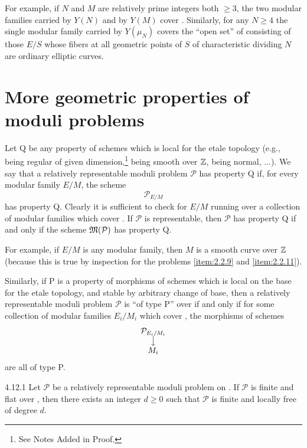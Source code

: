 For example, if $N$ and $M$ are relatively prime integers both $\ge 3$, the two modular families carried by $Y(N)$ and by $Y(M)$ cover \Ell. Similarly, for any $N \ge 4$ the single modular family carried by $Y(\mu_N)$ covers the ``open set'' of \Ell consisting of those $E/S$ whose fibers at all geometric points of $S$ of characteristic dividing $N$ are ordinary elliptic curves.

\section{More geometric properties of moduli problems}
\label{sec:4.12}

Let Q be any property of schemes which is local for the etale topology (e.g., being regular of given dimension,\footnote{See Notes Added in Proof.} being smooth over $\mathbb{Z}$, being normal, ...). We say that a relatively representable moduli problem $\mathcal{P}$ has property Q if, for every modular family $E/M$, the scheme
\[
\mathcal{P}_{E/M}
\]
has property Q. Clearly it is sufficient to check for $E/M$ running over a collection of modular families which cover \Ell. If $\mathcal{P}$ is representable, then $\mathcal{P}$ has property Q if and only if the scheme $\mathfrak{M}(\mathcal{P})$ has property Q.

For example, if $E/M$ is any modular family, then $M$ is a smooth curve over $\mathbb{Z}$ (because this is true by inspection for the problems \ref{item:2.2.9} and \ref{item:2.2.11}).

Similarly, if P is a property of morphisms of schemes which is local on the base for the etale topology, and stable by arbitrary change of base, then a relatively representable moduli problem $\mathcal{P}$ is ``of type P'' over \Ell if and only if for some collection of modular families $E_i/M_i$ which cover \Ell, the morphisms of schemes
\[
\begin{array}{@{}c@{}}
\mathcal{P}_{E_i/M_i} \\ \big\downarrow \\ M_i
\end{array}
\]
are all of type P.

\begin{plemnum}{4.12.1}\label{lem:4.12.1}
Let $\mathcal{P}$ be a relatively representable moduli problem on \Ell. If $\mathcal{P}$ is finite and flat over \Ell, then there exists an integer $d \ge 0$ such that $\mathcal{P}$ is finite and locally free of degree $d$.
\end{plemnum}

